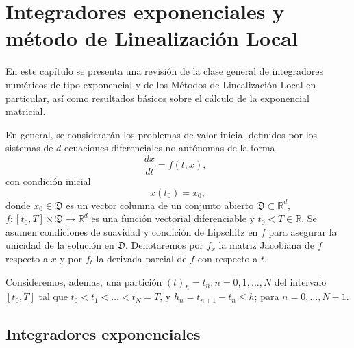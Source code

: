 \chapter{Integradores exponenciales y método de Linealización Local}\label{chapter:exp-int-and-ll-methods}

En este capítulo se presenta una revisión de la clase general de  integradores numéricos de tipo exponencial y de los Métodos de Linealización Local en particular, así como resultados básicos sobre el cálculo de la exponencial matricial.

En general, se considerarán los problemas de valor inicial definidos por los sistemas de $d$ ecuaciones diferenciales no autónomas de la forma
 \begin{equation}
 \frac{dx}{dt}=f(t,x), \;\; \label{ODE-SYST}
 \end{equation}
con condición inicial
 \begin{equation*}
 x(t_0)=x_0,
 \end{equation*}
 donde $x_0\in \mathfrak{D}$ es un vector columna de un conjunto abierto $\mathfrak{D}\subset\mathbb{R}^{d}$, $f: [t_0,T] \times \mathfrak{D}\longrightarrow \mathbb{R}^{d}$ es una función vectorial diferenciable y $t_0<T \in \mathbb{R}$. Se asumen condiciones de suavidad y condición de Lipschitz en $f$ para asegurar la unicidad de la solución en $\mathfrak{D}$. Denotaremos por $f_x$ la matriz Jacobiana de $f$ respecto a $x$ y por $f_t$ la derivada parcial de $f$ con respecto a $t$.

Consideremos, ademas, una partición $(t)_{h}={t_{n}:n=0,1,\ldots,N}$ del
intervalo $[t_{0},T]$ tal que $t_{0}<t_{1}<\ldots<t_{N}=T$, y $%
h_{n}=t_{n+1}-t_{n}\leq h$; para $n=0,\ldots,N-1$.

\section{Integradores exponenciales} \label{Sec:IE}

